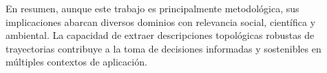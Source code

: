 En resumen, aunque este trabajo es principalmente metodológica, sus implicaciones abarcan diversos dominios con relevancia social, científica y ambiental. La capacidad de extraer descripciones topológicas robustas de trayectorias contribuye a la toma de decisiones informadas y sostenibles en múltiples contextos de aplicación.